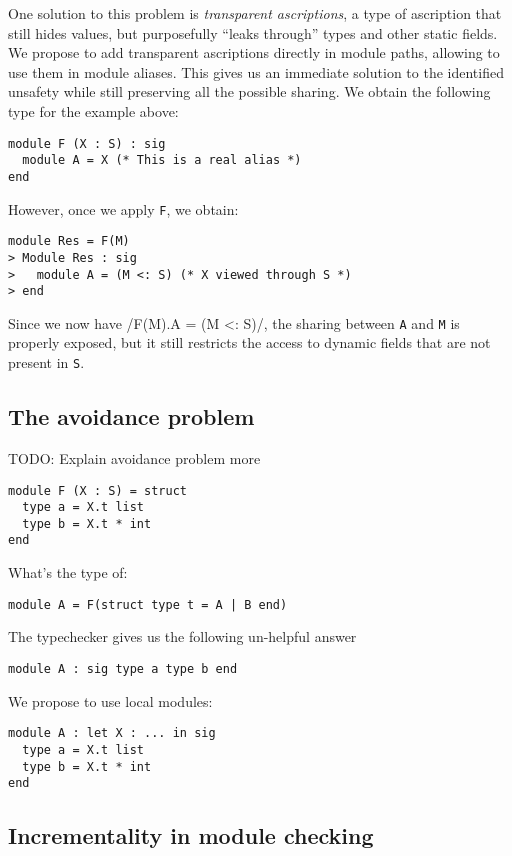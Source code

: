 One solution to this problem is \emph{transparent ascriptions}, a type of ascription
that still hides values, but purposefully ``leaks through'' types and other
static fields.
We propose to add transparent ascriptions directly in module paths, allowing
to use them in module aliases. This gives us an immediate
solution to the identified unsafety while still preserving all the possible sharing.
We obtain the following type for the example above:

\begin{verbatim}
module F (X : S) : sig
  module A = X (* This is a real alias *)
end
\end{verbatim}
However, once we apply \texttt{F}, we obtain:

\begin{verbatim}
module Res = F(M)
> Module Res : sig
>   module A = (M <: S) (* X viewed through S *)
> end
\end{verbatim}

Since we now have \ocaml/F(M).A = (M <: S)/, the sharing
between {\tt A} and {\tt M} is properly exposed,
but it still restricts the access to dynamic fields that are not
present in {\tt S}.

\subsection{The avoidance problem}

TODO: Explain avoidance problem more

\begin{verbatim}
module F (X : S) = struct
  type a = X.t list
  type b = X.t * int
end
\end{verbatim}

What's the type of:
\begin{verbatim}
module A = F(struct type t = A | B end)
\end{verbatim}

The typechecker gives us the following un-helpful answer
\begin{verbatim}
module A : sig type a type b end
\end{verbatim}

We propose to use local modules:

\begin{verbatim}
module A : let X : ... in sig
  type a = X.t list
  type b = X.t * int
end
\end{verbatim}

\subsection{Incrementality in module checking}

